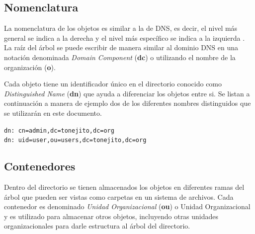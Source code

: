   \subsection {Nomenclatura}

La nomenclatura de los objetos es similar a la de DNS, es decir, el nivel m\'{a}s general se indica a la derecha y el nivel m\'{a}s espec\'{i}fico se indica a la izquierda \cite{zytrax}. La ra\'{i}z del \'{a}rbol se puede escribir de manera similar al dominio DNS en una notaci\'{o}n denominada \textit{Domain Component} (\textbf{dc}) o utilizando el nombre de la organizaci\'{o}n (\textbf{o}).

\begin{table}[H]
\caption{Nomenclatura del nodo ra\'{i}z de LDAP}{}
\label{tab:nomenclatura-ldap-root}
\noindent{} %
\end{table}

Cada objeto tiene un identificador \'{u}nico en el directorio conocido como \textit{Distinguished Name} (\textbf{dn}) que ayuda a diferenciar los objetos entre si. Se listan a continuaci\'{o}n a manera de ejemplo dos de los diferentes nombres distinguidos que se utilizar\'{a}n en este documento.

{
\scriptsize
\linespread{1}
\begin{center}
  \verb|dn: cn=admin,dc=tonejito,dc=org|
  \\
  \verb|dn: uid=user,ou=users,dc=tonejito,dc=org|
\end{center}
}

  \subsection{Contenedores}

Dentro del directorio se tienen almacenados los objetos en diferentes ramas del \'{a}rbol que pueden ser vistas como carpetas en un sistema de archivos. Cada contenedor es denominado \textit{Unidad Organizacional} (\textbf{ou}) o Unidad Organizacional y es utilizado para almacenar otros objetos, incluyendo otras unidades organizacionales para darle estructura al \'{a}rbol del directorio.

